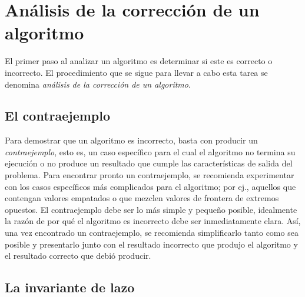 \chapter{Análisis de la corrección de un algoritmo}

El primer paso al analizar un algoritmo es determinar si este es correcto o incorrecto. 
El procedimiento que se sigue para llevar a cabo esta tarea se denomina \emph{análisis de la corrección de un algoritmo}.

\section{El contraejemplo}




Para demostrar que un algoritmo es incorrecto, basta con producir un \emph{contraejemplo}, esto es, un caso específico para el cual el algoritmo no termina su ejecución o no produce un resultado que cumple las características de salida del problema.
Para encontrar pronto un contraejemplo, se recomienda experimentar con los casos específicos más complicados para el algoritmo; por ej., aquellos que contengan valores empatados o que mezclen valores de frontera de extremos opuestos.
El contraejemplo debe ser lo más simple y pequeño posible, idealmente la razón de por qué el algoritmo es incorrecto debe ser inmediatamente clara. 
Así, una vez encontrado un contraejemplo, se recomienda simplificarlo tanto como sea posible y presentarlo junto con el resultado incorrecto que produjo el algoritmo y el resultado correcto que debió producir.


\section{La invariante de lazo}

